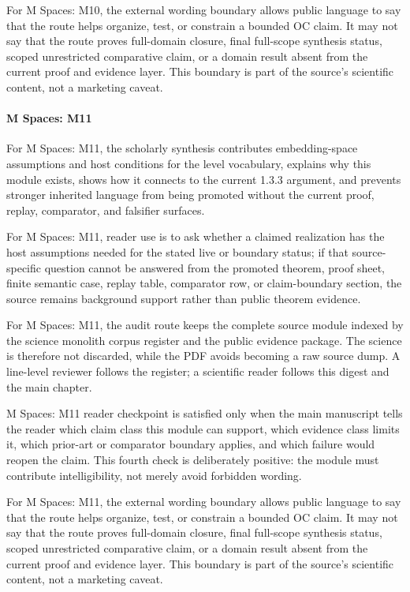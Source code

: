 For M Spaces: M10, the external wording boundary allows public language to say that the route helps organize, test, or constrain a bounded OC claim. It may not say that the route proves full-domain closure, final full-scope synthesis status, scoped unrestricted comparative claim, or a domain result absent from the current proof and evidence layer. This boundary is part of the source's scientific content, not a marketing caveat.


\paragraph{M Spaces: M11}

For M Spaces: M11, the scholarly synthesis contributes embedding-space assumptions and host conditions for the level vocabulary, explains why this module exists, shows how it connects to the current 1.3.3 argument, and prevents stronger inherited language from being promoted without the current proof, replay, comparator, and falsifier surfaces.


For M Spaces: M11, reader use is to ask whether a claimed realization has the host assumptions needed for the stated live or boundary status; if that source-specific question cannot be answered from the promoted theorem, proof sheet, finite semantic case, replay table, comparator row, or claim-boundary section, the source remains background support rather than public theorem evidence.


For M Spaces: M11, the audit route keeps the complete source module indexed by the science monolith corpus register and the public evidence package. The science is therefore not discarded, while the PDF avoids becoming a raw source dump. A line-level reviewer follows the register; a scientific reader follows this digest and the main chapter.


M Spaces: M11 reader checkpoint is satisfied only when the main manuscript tells the reader which claim class this module can support, which evidence class limits it, which prior-art or comparator boundary applies, and which failure would reopen the claim. This fourth check is deliberately positive: the module must contribute intelligibility, not merely avoid forbidden wording.


For M Spaces: M11, the external wording boundary allows public language to say that the route helps organize, test, or constrain a bounded OC claim. It may not say that the route proves full-domain closure, final full-scope synthesis status, scoped unrestricted comparative claim, or a domain result absent from the current proof and evidence layer. This boundary is part of the source's scientific content, not a marketing caveat.


